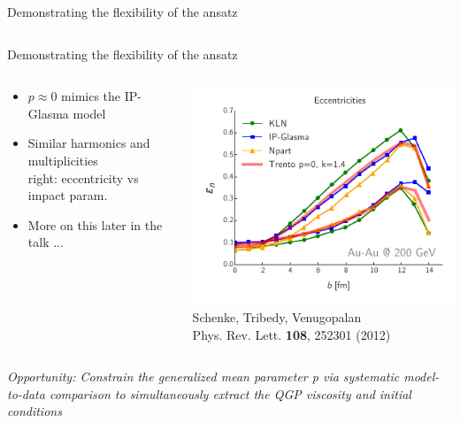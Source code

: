 \documentclass[svgnames]{beamer}
\begin{document}
\begin{frame}{Demonstrating the flexibility of the ansatz}
\begin{columns}
\begin{column}{0.4\textwidth}
  \end{column}

 \end{columns}

\end{frame}

\begin{frame}[t]{Demonstrating the flexibility of the ansatz}
  \begin{columns}
   \begin{column}{0.55\textwidth}
    \vspace{-1 in}
    \begin{itemize}
     \item $p \approx 0$ mimics the IP-Glasma model
     \vspace{0.05 in}
     \item Similar harmonics and multiplicities \\
	  right: eccentricity vs impact param. \\
     \vspace{0.05 in}
     \item More on this later in the talk ...
    \end{itemize}
   \end{column}
   \begin{column}{0.45\textwidth}
    \centering 
    \vspace{0.05 in}
    \includegraphics[width=\columnwidth]{trento-v-glasma} \\
    {\scriptsize Schenke, Tribedy, Venugopalan \\ Phys. Rev. Lett.  {\bf 108}, 252301 (2012) }
   \end{column}

  \end{columns}
  
  \vspace{0.2 in}
  \emph{Opportunity: Constrain the generalized mean parameter p via systematic model-to-data comparison to simultaneously extract the QGP viscosity and 
    initial conditions}


  
\end{frame}
\end{document}
